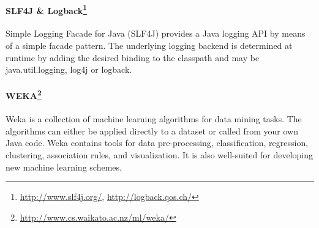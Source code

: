 \paragraph{SLF4J \& Logback\footnote{\url{http://www.slf4j.org/}, \url{http://logback.qos.ch/}}}
Simple Logging Facade for Java (SLF4J) provides a Java logging API by means
of a simple facade pattern. The underlying logging backend is determined
at runtime by adding the desired binding to the classpath and may be
java.util.logging, log4j or logback.

\paragraph{WEKA\footnote{\url{http://www.cs.waikato.ac.nz/ml/weka/}}}
Weka is a collection of machine learning algorithms for data mining tasks.
The algorithms can either be applied directly to a dataset or called from your
own Java code. Weka contains tools for data pre-processing, classification,
regression, clustering, association rules, and visualization. It is also
well-suited for developing new machine learning schemes.

